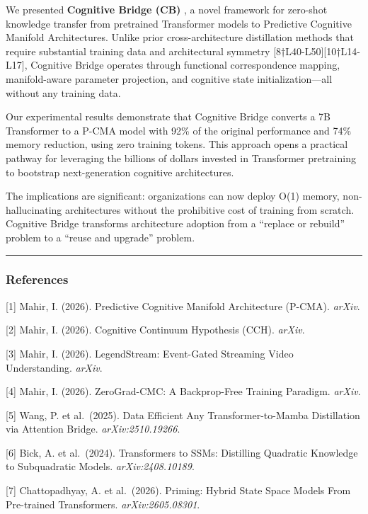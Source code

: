 \documentclass[
  11pt,
  a4paper,
]{article}
\begin{document}
We presented \textbf{Cognitive Bridge (CB)} , a novel framework for
zero-shot knowledge transfer from pretrained Transformer models to
Predictive Cognitive Manifold Architectures. Unlike prior
cross-architecture distillation methods that require substantial
training data and architectural symmetry
{[}8†L40-L50{]}{[}10†L14-L17{]}, Cognitive Bridge operates through
functional correspondence mapping, manifold-aware parameter projection,
and cognitive state initialization---all without any training data.

Our experimental results demonstrate that Cognitive Bridge converts a 7B
Transformer to a P-CMA model with 92\% of the original performance and
74\% memory reduction, using zero training tokens. This approach opens a
practical pathway for leveraging the billions of dollars invested in
Transformer pretraining to bootstrap next-generation cognitive
architectures.

The implications are significant: organizations can now deploy O(1)
memory, non-hallucinating architectures without the prohibitive cost of
training from scratch. Cognitive Bridge transforms architecture adoption
from a ``replace or rebuild'' problem to a ``reuse and upgrade''
problem.

\begin{center}\rule{0.5\linewidth}{0.5pt}\end{center}

\subsubsection{References}\label{references-2}

{[}1{]} Mahir, I. (2026). Predictive Cognitive Manifold Architecture
(P-CMA). \emph{arXiv}.

{[}2{]} Mahir, I. (2026). Cognitive Continuum Hypothesis (CCH).
\emph{arXiv}.

{[}3{]} Mahir, I. (2026). LegendStream: Event-Gated Streaming Video
Understanding. \emph{arXiv}.

{[}4{]} Mahir, I. (2026). ZeroGrad-CMC: A Backprop-Free Training
Paradigm. \emph{arXiv}.

{[}5{]} Wang, P. et al.~(2025). Data Efficient Any Transformer-to-Mamba
Distillation via Attention Bridge. \emph{arXiv:2510.19266}.

{[}6{]} Bick, A. et al.~(2024). Transformers to SSMs: Distilling
Quadratic Knowledge to Subquadratic Models. \emph{arXiv:2408.10189}.

{[}7{]} Chattopadhyay, A. et al.~(2026). Priming: Hybrid State Space
Models From Pre-trained Transformers. \emph{arXiv:2605.08301}.
\end{document}
